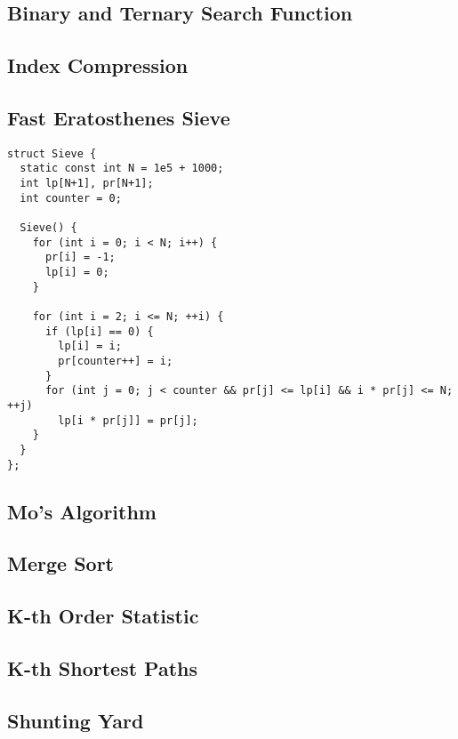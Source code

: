 \subsection{Binary and Ternary Search Function}
\subsection{Index Compression}
\subsection{Fast Eratosthenes Sieve}

\begin{lstlisting}
struct Sieve {
  static const int N = 1e5 + 1000;
  int lp[N+1], pr[N+1];
  int counter = 0;

  Sieve() {
    for (int i = 0; i < N; i++) {
      pr[i] = -1;
      lp[i] = 0;
    }
    
    for (int i = 2; i <= N; ++i) {
      if (lp[i] == 0) {
        lp[i] = i;
        pr[counter++] = i;
      }
      for (int j = 0; j < counter && pr[j] <= lp[i] && i * pr[j] <= N; ++j)
        lp[i * pr[j]] = pr[j];
    }
  }
};
\end{lstlisting}

\subsection{Mo's Algorithm}
\subsection{Merge Sort}
\subsection{K-th Order Statistic}
\subsection{K-th Shortest Paths}
\subsection{Shunting Yard}
